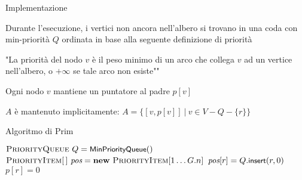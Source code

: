 \begin{frame}{Implementazione}

\vspace{-9pt}
\begin{myboxtitle}
\BI
\item Durante l'esecuzione, i vertici non ancora nell'albero si trovano in una 
coda con min-priorità $Q$ ordinata in base alla seguente definizione di priorità
\item "La priorità del nodo $v$ è il peso minimo di un arco che collega $v$ ad
un vertice nell'albero, o $+\infty$ se tale arco non esiste""
\EI
\end{myboxtitle}

\begin{myboxtitle}
\BI
\item Ogni nodo $v$ mantiene un puntatore al padre $p[v]$
\item $A$ è mantenuto implicitamente: $A = \{ [v, p[v]] ~|~ v \in V - Q - \{ r \} \}$
\EI
\end{myboxtitle}

\end{frame}



\begin{frame}{Algoritmo di Prim}

\vspace{-12pt}
\begin{Procedure}
\caption[A]{\prim($\Graph\ G,\ \Node\ r, \INTARRAY\ p$)}

$\textsc{PriorityQueue}\ Q = \textsf{{\small MinPriorityQueue}}()$\;
$\PriorityItem[\,]\ \Pos = \NEW\ \PriorityItem[1 \mldots G.n]$\;
$\textit{pos}[r] = Q.\textsf{{\small insert}}(r, 0)$\;
$p[r] = 0$\;
\end{Procedure}
\end{frame}


